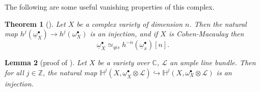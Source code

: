 \documentclass[proquest]{uwthesis}[2014/11/13]
\newtheorem{theorem}{Theorem}[section]
\newtheorem{prop}[theorem]{Proposition}
\newtheorem{lemma}[theorem]{Lemma}
\theoremstyle{definition}
\DeclareMathOperator{\Hom}{Hom}
\newcommand{\CC}{\mathbb{C}}
\newcommand{\EE}{\mathscr{E}}
\newcommand{\HH}{\mathbb{H}}
\newcommand{\LL}{\mathcal{L}}
\newcommand{\OO}{\mathcal{O}}
\newcommand{\qis}{\simeq_{qis}}
\newcommand{\bR}{\textbf{R}}
\newcommand{\ZZ}{\mathbb{Z}}
\newcommand{\db}{\underline{\omega}^\bullet}
\begin{document}
The following are some useful vanishing properties of this complex.

\begin{theorem}[{\cite[3.3, 3.5]{Kovacs2011a}}]
	\label{thm:duboisgr}
	Let $X$ be a complex variety of dimension $n$.
	Then the natural map $h^j (\db_X) \rightarrow h^j (\omega_X^\bullet)$ is an injection, and if $X$ is Cohen-Macaulay then
	\[
		\db_X \qis h^{-n} (\db_x)[n].
	\]
\end{theorem}

	

\begin{lemma}[proof of {\cite[3.3]{Kovacs2011a}}]
	Let $X$ be a variety over $\CC$, $\LL$ an ample line bundle.
	Then for all $j \in \ZZ$, the natural map
	$\HH^j(X, \db_X \otimes \LL) \hookrightarrow \HH^j(X,\omega_X^\bullet \otimes \LL)$ is an injection.
\end{lemma}
\end{document}
